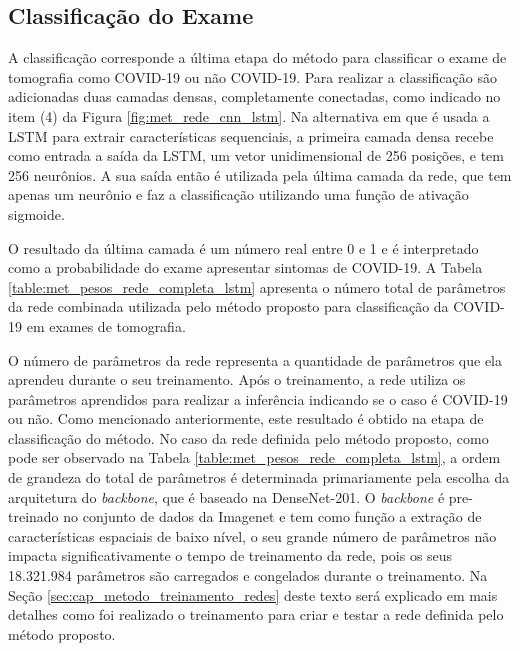 \subsection{Classificação do Exame}\label{subsec:cap_metodo_classificacao}

A classificação corresponde a última etapa do método para classificar o exame de tomografia como COVID-19 ou não COVID-19. Para realizar a classificação são adicionadas duas camadas densas, completamente conectadas, como indicado no item (4) da Figura \ref{fig:met_rede_cnn_lstm}. Na alternativa em que é usada a LSTM para extrair características sequenciais, a primeira camada densa recebe como entrada a saída da LSTM, um vetor unidimensional de 256 posições, e tem 256 neurônios. A sua saída então é utilizada pela última camada da rede, que tem apenas um neurônio e faz a classificação utilizando uma função de ativação sigmoide. 

O resultado da última camada é um número real entre 0 e 1 e é interpretado como a probabilidade do exame apresentar sintomas de COVID-19. A Tabela \ref{table:met_pesos_rede_completa_lstm} apresenta o número total de parâmetros da rede combinada utilizada pelo método proposto para classificação da COVID-19 em exames de tomografia.

O número de parâmetros da rede representa a quantidade de parâmetros que ela aprendeu durante o seu treinamento. Após o treinamento, a rede utiliza os parâmetros aprendidos para realizar a inferência indicando se o caso é COVID-19 ou não. Como mencionado anteriormente, este resultado é obtido na etapa de classificação do método. No caso da rede definida pelo método proposto, como pode ser observado na Tabela \ref{table:met_pesos_rede_completa_lstm}, a ordem de grandeza do total de parâmetros é determinada primariamente pela escolha da arquitetura do \textit{backbone}, que é baseado na DenseNet-201. O \textit{backbone} é pre-treinado no conjunto de dados da Imagenet e tem como função a extração de características espaciais de baixo nível, o seu grande número de parâmetros não impacta significativamente o tempo de treinamento da rede, pois os seus 18.321.984 parâmetros são carregados e congelados durante o treinamento. Na Seção \ref{sec:cap_metodo_treinamento_redes} deste texto será explicado em mais detalhes como foi realizado o treinamento para criar e testar a rede definida pelo método proposto.

